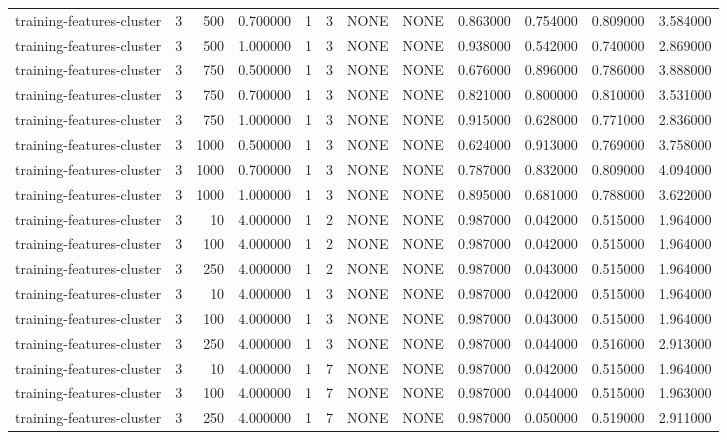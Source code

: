 \begin{tabular}{lrrrllllrrrr}
training-features-cluster & 3 & 500 & 0.700000 & 1 & 3 & NONE & NONE & 0.863000 & 0.754000 & 0.809000 & 3.584000 \\
training-features-cluster & 3 & 500 & 1.000000 & 1 & 3 & NONE & NONE & 0.938000 & 0.542000 & 0.740000 & 2.869000 \\
training-features-cluster & 3 & 750 & 0.500000 & 1 & 3 & NONE & NONE & 0.676000 & 0.896000 & 0.786000 & 3.888000 \\
training-features-cluster & 3 & 750 & 0.700000 & 1 & 3 & NONE & NONE & 0.821000 & 0.800000 & 0.810000 & 3.531000 \\
training-features-cluster & 3 & 750 & 1.000000 & 1 & 3 & NONE & NONE & 0.915000 & 0.628000 & 0.771000 & 2.836000 \\
training-features-cluster & 3 & 1000 & 0.500000 & 1 & 3 & NONE & NONE & 0.624000 & 0.913000 & 0.769000 & 3.758000 \\
training-features-cluster & 3 & 1000 & 0.700000 & 1 & 3 & NONE & NONE & 0.787000 & 0.832000 & 0.809000 & 4.094000 \\
training-features-cluster & 3 & 1000 & 1.000000 & 1 & 3 & NONE & NONE & 0.895000 & 0.681000 & 0.788000 & 3.622000 \\
training-features-cluster & 3 & 10 & 4.000000 & 1 & 2 & NONE & NONE & 0.987000 & 0.042000 & 0.515000 & 1.964000 \\
training-features-cluster & 3 & 100 & 4.000000 & 1 & 2 & NONE & NONE & 0.987000 & 0.042000 & 0.515000 & 1.964000 \\
training-features-cluster & 3 & 250 & 4.000000 & 1 & 2 & NONE & NONE & 0.987000 & 0.043000 & 0.515000 & 1.964000 \\
training-features-cluster & 3 & 10 & 4.000000 & 1 & 3 & NONE & NONE & 0.987000 & 0.042000 & 0.515000 & 1.964000 \\
training-features-cluster & 3 & 100 & 4.000000 & 1 & 3 & NONE & NONE & 0.987000 & 0.043000 & 0.515000 & 1.964000 \\
training-features-cluster & 3 & 250 & 4.000000 & 1 & 3 & NONE & NONE & 0.987000 & 0.044000 & 0.516000 & 2.913000 \\
training-features-cluster & 3 & 10 & 4.000000 & 1 & 7 & NONE & NONE & 0.987000 & 0.042000 & 0.515000 & 1.964000 \\
training-features-cluster & 3 & 100 & 4.000000 & 1 & 7 & NONE & NONE & 0.987000 & 0.044000 & 0.515000 & 1.963000 \\
training-features-cluster & 3 & 250 & 4.000000 & 1 & 7 & NONE & NONE & 0.987000 & 0.050000 & 0.519000 & 2.911000 \\

\end{tabular}
